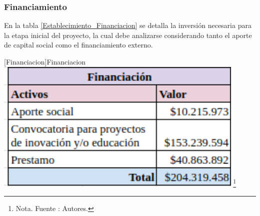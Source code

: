 \subsubsection{Financiamiento}
En la tabla \ref{Establecimiento_Financiacion} se detalla la inversión necesaria para la etapa inicial del proyecto, la cual debe analizarse considerando tanto el aporte de capital social como el financiamiento externo.

\vspace{2mm}
        \begin{minipage}{0.9\textwidth}
        \centering
        [{Financiacion}]{Financiacion}
        \label{Establecimiento_Financiacion}
        \includegraphics[width=0.9\textwidth]{Content/Images/AF/Establecimiento_Financiacion.png}
        \footnote{Nota. \textup{Fuente : Autores.}}
        \end{minipage}
